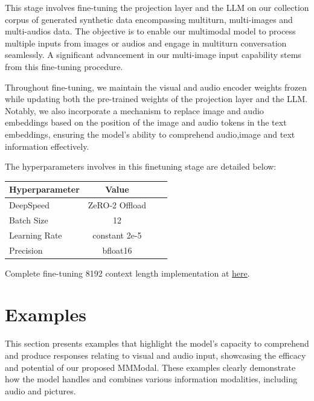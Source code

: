 \documentclass[preprint]{article}
\begin{document}
This stage involves fine-tuning the projection layer and the LLM on our collection corpus of generated synthetic data encompassing multiturn, multi-images and multi-audios data. The objective is to enable our multimodal model to process multiple inputs from images or audios and engage in multiturn conversation seamlessly. A significant advancement in our multi-image input capability stems from this fine-tuning procedure.

Throughout fine-tuning, we maintain the visual and audio encoder weights frozen while updating both the pre-trained weights of the projection layer and the LLM. Notably, we also incorporate a mechanism to replace image and audio embeddings based on the position of the image and audio tokens in the text embeddings, ensuring the model's ability to comprehend audio,image and text information effectively.

The hyperparameters involves in this finetuning stage are detailed below:

\begin{table}[h]
  \centering
  \begin{tabular}{lccl}
    \hline
    \textbf{Hyperparameter} & \textbf{Value} \\
    \hline
    DeepSpeed               & ZeRO-2 Offload \\
    Batch Size              & 12             \\
    Learning Rate           & constant 2e-5  \\
    Precision               & bfloat16       \\
    \hline
  \end{tabular}
\end{table}

Complete fine-tuning 8192 context length implementation at \href{https://github.com/mesolitica/multimodal-LLM/blob/master/run-deepspeed.sh}{here}.

\section{Examples}

This section presents examples that highlight the model's capacity to comprehend and produce responses relating to visual and audio input, showcasing the efficacy and potential of our proposed MMModal. These examples clearly demonstrate how the model handles and combines various information modalities, including audio and pictures.
\end{document}
